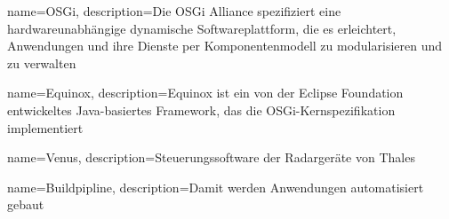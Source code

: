 \makeglossaries
{}
{
    name=OSGi,
    description={Die OSGi Alliance spezifiziert eine hardwareunabhängige dynamische Softwareplattform, die es erleichtert, Anwendungen und ihre Dienste per Komponentenmodell zu modularisieren und zu verwalten}
}

{
    name=Equinox,
    description={Equinox ist ein von der Eclipse Foundation entwickeltes Java-basiertes Framework, das die OSGi-Kernspezifikation implementiert}
}

{
    name=Venus,
    description={Steuerungssoftware der Radargeräte von Thales}
}

{
    name=Buildpipline,
    description={Damit werden Anwendungen automatisiert gebaut}
}

